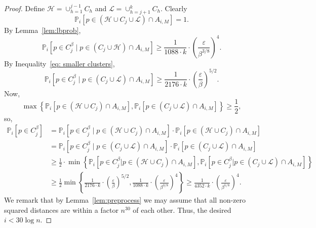 \documentclass[10pt,a4paper]{amsart}
\providecommand{\cal}{\mathcal}
\begin{document}
\begin{proof}
Define ${\cal H} = \cup_{h=1}^{j-1} C_h$ and $\mathcal{L} = \cup_{h=j+1}^k C_h$.
Clearly 
$$\mathbb{P}_i[p\in (\mathcal{H}\cup C_j\cup \mathcal{L})\cap A_{i,M}] = 1.$$
By Lemma~\ref{lem:lbprob}, 
$$
\mathbb{P}_i[p\in C_j^\beta\mid p\in (C_j\cup\mathcal{H})\cap A_{i,M}] \geq \frac{1}{1088\cdot k}\cdot
 \left(\frac{\varepsilon}{\beta^{3/8}}\right)^4.
$$
By Inequality~\eqref{eq: smaller clusters},
$$\mathbb{P}_i[p\in C_j^\beta\mid p\in (C_j\cup\mathcal{L})\cap A_{i,M}] \geq \frac{1}{2176 \cdot k} \cdot \left(\frac{\varepsilon}{\beta}\right)^{5/2}.$$
Now,
$$\max\left\{\mathbb{P}_i[p\in (\mathcal{H}\cup C_j)\cap A_{i,M}], 
\mathbb{P}_i[p\in (C_j\cup\mathcal{L})\cap A_{i,M}]\right\}\geq \frac 1 2,$$ 
so, 
\begin{align*}
 \mathbb{P}_i[p\in C_j^\beta] &= \mathbb{P}_i[p\in C_j^\beta \mid p\in (\mathcal{H}\cup C_j)\cap A_{i,M}]\cdot \mathbb{P}_i[p\in (\mathcal{H}\cup C_j)\cap A_{i,M}] \\  
 &= \mathbb{P}_i[p\in C_j^\beta \mid p\in (C_j\cup\mathcal{L})\cap A_{i,M}]\cdot 
  \mathbb{P}_i[p\in (C_j\cup\mathcal{L})\cap A_{i,M}] \\
 &\geq \frac 1 2 \cdot \min\left\{\mathbb{P}_i[p\in C_j^\beta | p\in (\mathcal{H}\cup C_j)\cap A_{i,M}], \mathbb{P}_i[p\in C_j^\beta | p\in (C_j\cup\mathcal{L})\cap A_{i,M}]\right\} \\
 &\geq \frac{1}{2}\min\left\{\frac{1}{2176 \cdot k} \cdot \left(\frac{\varepsilon}{\beta}\right)^{5/2},
 \frac{1}{1088\cdot k}\cdot
 \left(\frac{\varepsilon}{\beta^{3/8}}\right)^4\right\} \geq \frac{1}{4352\cdot k}\cdot \left(\frac{\varepsilon}{\beta^{5/8}}\right)^4.
\end{align*}
We remark that by Lemma~\ref{lem:preprocess} we may assume that all non-zero squared distances are within a factor $n^{30}$ of each other. Thus, the desired $i < 30\log n$.
\end{proof}
\end{document}
